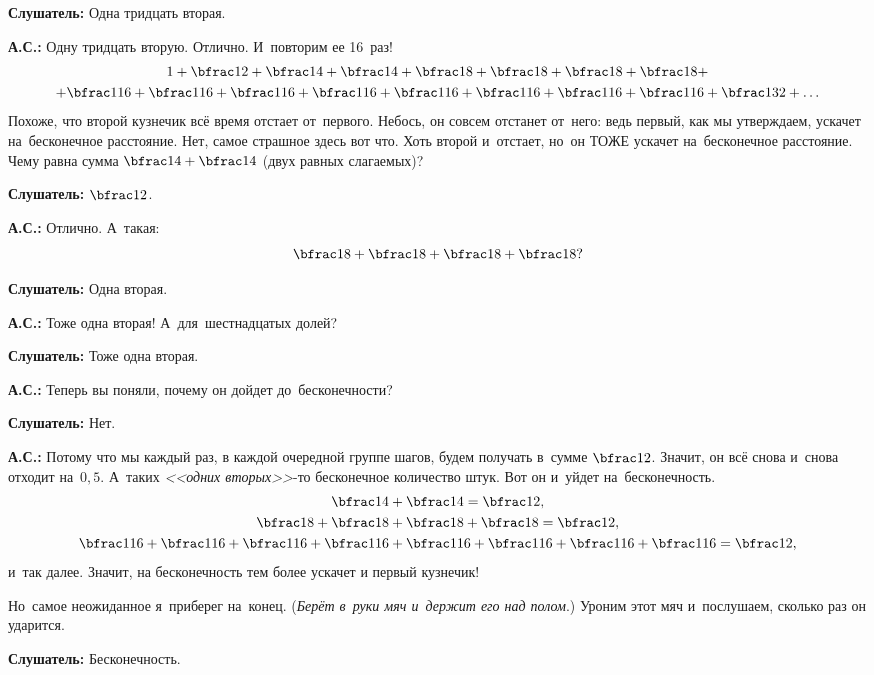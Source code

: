 \textbf{Слушатель:} Одна тридцать вторая.

\textbf{А.С.:} Одну тридцать вторую. Отлично. И~повторим ее 16~раз!
\begin{multline*}
1+\bfrac12+\bfrac14+\bfrac14+
\bfrac18+\bfrac18+\bfrac18+\bfrac18+
\\+
\bfrac1{16}+\bfrac1{16}+\bfrac1{16}+\bfrac1{16}+\bfrac1{16}+\bfrac1{16}+\bfrac1{16}+\bfrac1{16}+
\bfrac1{32}+\ldots
\end{multline*}
Похоже, что второй кузнечик всё время отстает от~первого. Небось, он совсем отстанет от~него: ведь
первый, как мы утверждаем, ускачет на~бесконечное расстояние.
 Нет, самое страшное здесь вот что. Хоть второй и~отстает,
но~он ТОЖЕ ускачет на~бесконечное расстояние. Чему равна сумма $\bfrac14+\bfrac14$ (двух равных слагаемых)?

\textbf{Слушатель:} $\bfrac12$.

\textbf{А.С.:} Отлично. А~такая: $$\bfrac18+\bfrac18+\bfrac18+\bfrac18?$$

\textbf{Слушатель:} Одна вторая.

\textbf{А.С.:} Тоже одна вторая! А~для~шестнадцатых долей?

\textbf{Слушатель:} Тоже одна вторая.

\textbf{А.С.:} Теперь вы поняли, почему он дойдет до~бесконечности?

\textbf{Слушатель:} Нет.

\pagebreak

\textbf{А.С.:} Потому что мы каждый раз, в каждой очередной группе шагов, будем получать в~сумме $\bfrac12$.
Значит, он всё снова и~снова отходит на~$0{,}5$.
А~таких \textit{<<одних вторых>>}-то бесконечное количество штук. Вот он и~уйдет на~бесконечность.
\begin{gather*}
\bfrac14+\bfrac14=\bfrac12,\\
\bfrac18+\bfrac18+\bfrac18+\bfrac18=\bfrac12,\\
\bfrac1{16}+\bfrac1{16}+\bfrac1{16}+\bfrac1{16}+\bfrac1{16}+\bfrac1{16}+\bfrac1{16}+\bfrac1{16}=\bfrac1{2},
\end{gather*}
и~так далее. Значит, на бесконечность тем более ускачет и первый кузнечик!

Но~самое неожиданное я~приберег на~конец. (\textit{Берёт в~руки мяч и~держит его над полом}.) Уроним этот мяч
и~послушаем, сколько раз он ударится.

\textbf{Слушатель:} Бесконечность.

